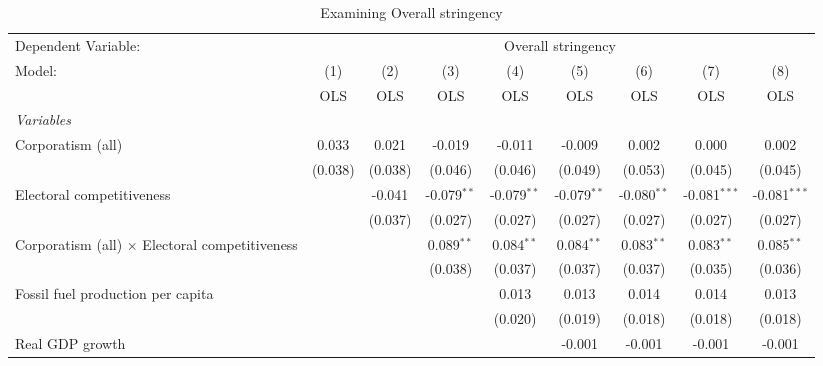 
\begin{table}[htbp]
   \caption{Examining Overall stringency}
   \centering
   \begin{tabular}{lcccccccc}
      \toprule
      Dependent Variable: & \multicolumn{8}{c}{Overall stringency}\\
      Model:                                                & (1)     & (2)     & (3)           & (4)           & (5)           & (6)           & (7)            & (8)\\  
                                                            &  OLS    & OLS     & OLS           & OLS           & OLS           & OLS           & OLS            & OLS\\  
      \midrule
      \emph{Variables}\\
      Corporatism (all)                                     & 0.033   & 0.021   & -0.019        & -0.011        & -0.009        & 0.002         & 0.000          & 0.002\\   
                                                            & (0.038) & (0.038) & (0.046)       & (0.046)       & (0.049)       & (0.053)       & (0.045)        & (0.045)\\   
      Electoral competitiveness                             &         & -0.041  & -0.079$^{**}$ & -0.079$^{**}$ & -0.079$^{**}$ & -0.080$^{**}$ & -0.081$^{***}$ & -0.081$^{***}$\\   
                                                            &         & (0.037) & (0.027)       & (0.027)       & (0.027)       & (0.027)       & (0.027)        & (0.027)\\   
      Corporatism (all) $\times$ Electoral competitiveness  &         &         & 0.089$^{**}$  & 0.084$^{**}$  & 0.084$^{**}$  & 0.083$^{**}$  & 0.083$^{**}$   & 0.085$^{**}$\\   
                                                            &         &         & (0.038)       & (0.037)       & (0.037)       & (0.037)       & (0.035)        & (0.036)\\   
      Fossil fuel production per capita                     &         &         &               & 0.013         & 0.013         & 0.014         & 0.014          & 0.013\\   
                                                            &         &         &               & (0.020)       & (0.019)       & (0.018)       & (0.018)        & (0.018)\\   
      Real GDP growth                                       &         &         &               &               & -0.001        & -0.001        & -0.001         & -0.001\\   

\end{tabular}
\end{table}

